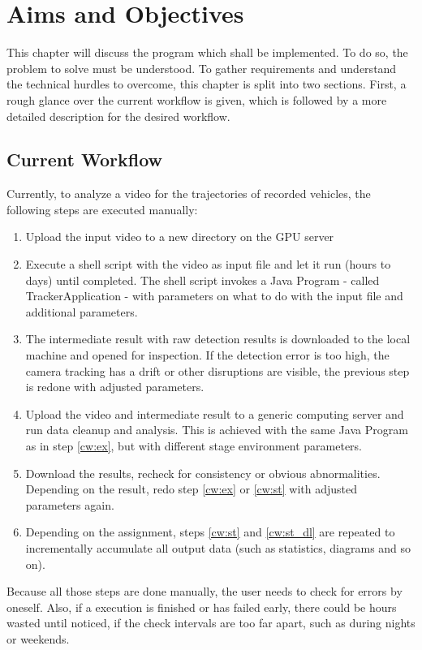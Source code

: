 \chapter{Aims and Objectives}

This chapter will discuss the program which shall be implemented.
To do so, the problem to solve must be understood.
To gather requirements and understand the technical hurdles to overcome, this chapter is split into two sections.
First, a rough glance over the current workflow is given, which is followed by a more detailed description for the desired workflow.


\section{Current Workflow}

Currently, to analyze a video for the trajectories of  recorded vehicles, the following steps are executed manually:
\begin{enumerate}
	\item Upload the input video to a new directory on the GPU server
	\item \label{cw:ex} Execute a shell script with the video as input file and let it run (hours to days) until completed. The shell script invokes a Java Program - called TrackerApplication - with parameters on what to do with the input file and additional parameters.
	\item The intermediate result with raw detection results is downloaded to the local machine and opened for inspection. If the detection error is too high, the camera tracking has a drift or other disruptions are visible, the previous step is redone with adjusted parameters.
	\item \label{cw:st} Upload the video and intermediate result to a generic computing server and run data cleanup and analysis. This is achieved with the same Java Program as in step \ref{cw:ex}, but with different stage environment parameters.
	\item \label{cw:st_dl} Download the results, recheck for consistency or obvious abnormalities. Depending on the result, redo step \ref{cw:ex} or \ref{cw:st} with adjusted parameters again.
	\item Depending on the assignment, steps \ref{cw:st} and \ref{cw:st_dl} are repeated to incrementally accumulate all output data (such as statistics, diagrams and so on).
\end{enumerate}

Because all those steps are done manually, the user needs to check for errors by oneself.
Also, if a execution is finished or has failed early, there could be hours wasted until noticed, if the check intervals are too far apart, such as during nights or weekends.

